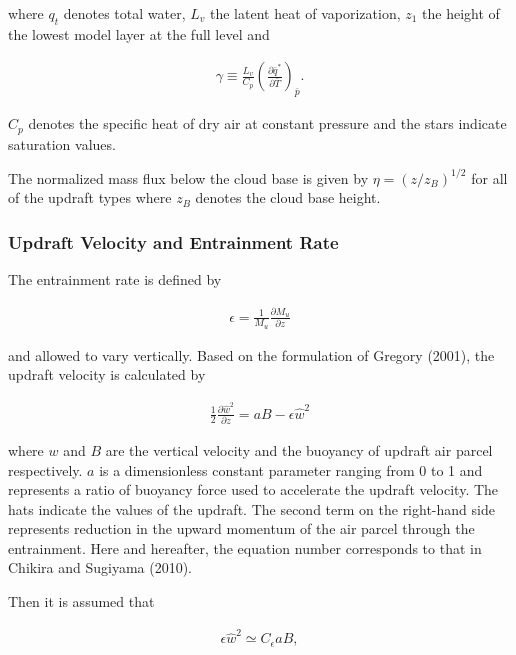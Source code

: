 where \(q_t\) denotes total water, \(L_v\) the latent heat of
vaporization, \(z_1\) the height of the lowest model layer at the full
level and

\begin{eqnarray}
 \gamma \equiv \frac{L_v}{C_p}\left(\frac{\partial \bar{q}^*}{\partial \bar{T}}\right)_{\bar{p}}.
\end{eqnarray}

\(C_p\) denotes the specific heat of dry air at constant pressure and
the stars indicate saturation values.

The normalized mass flux below the cloud base is given by
\(\eta = (z/z_B)^{1/2}\) for all of the updraft types where \(z_B\)
denotes the cloud base height.

\hypertarget{updraft-velocity-and-entrainment-rate}{%
\subsubsection{Updraft Velocity and Entrainment
Rate}\label{updraft-velocity-and-entrainment-rate}}

The entrainment rate is defined by

\begin{eqnarray}
 \epsilon = \frac{1}{M_u}\frac{\partial M_u}{\partial z}
\end{eqnarray}

and allowed to vary vertically. Based on the formulation of Gregory
(2001), the updraft velocity is calculated by

\begin{eqnarray}
 \frac{1}{2}\frac{\partial \hat{w}^2}{\partial z} = aB - \epsilon \hat{w}^2 \label{p-cum.1}
\end{eqnarray}

where \(w\) and \(B\) are the vertical velocity and the buoyancy of
updraft air parcel respectively. \(a\) is a dimensionless constant
parameter ranging from 0 to 1 and represents a ratio of buoyancy force
used to accelerate the updraft velocity. The hats indicate the values of
the updraft. The second term on the right-hand side represents reduction
in the upward momentum of the air parcel through the entrainment. Here
and hereafter, the equation number corresponds to that in Chikira and
Sugiyama (2010).

Then it is assumed that

\begin{eqnarray}
 \epsilon \hat{w}^2 \simeq C_\epsilon a B,
\end{eqnarray}

